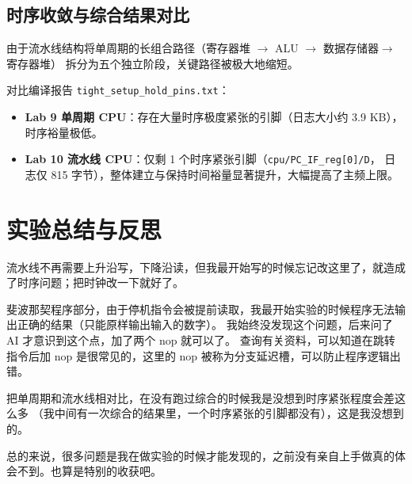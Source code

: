 \documentclass[12pt, a4paper]{ctexart}
\begin{document}
\subsection{时序收敛与综合结果对比}

由于流水线结构将单周期的长组合路径（寄存器堆 $\to$ ALU $\to$ 数据存储器$\to$ 寄存器堆）
拆分为五个独立阶段，关键路径被极大地缩短。

对比编译报告 \texttt{tight\_setup\_hold\_pins.txt}：
\begin{itemize}
    \item \textbf{Lab 9 单周期 CPU}：存在大量时序极度紧张的引脚（日志大小约 3.9 KB），时序裕量极低。
    \item \textbf{Lab 10 流水线 CPU}：仅剩 1 个时序紧张引脚（\texttt{cpu/PC\_IF\_reg[0]/D}，
    日志仅 815 字节），整体建立与保持时间裕量显著提升，大幅提高了主频上限。
\end{itemize}

\section{实验总结与反思}

流水线不再需要上升沿写，下降沿读，但我最开始写的时候忘记改这里了，就造成了时序问题；把时钟改一下就好了。

斐波那契程序部分，由于停机指令会被提前读取，我最开始实验的时候程序无法输出正确的结果（只能原样输出输入的数字）。
我始终没发现这个问题，后来问了 AI 才意识到这个点，加了两个 nop 就可以了。
查询有关资料，可以知道在跳转指令后加 nop 是很常见的，这里的 nop 被称为分支延迟槽，可以防止程序逻辑出错。

把单周期和流水线相对比，在没有跑过综合的时候我是没想到时序紧张程度会差这么多
（我中间有一次综合的结果里，一个时序紧张的引脚都没有），这是我没想到的。

总的来说，很多问题是我在做实验的时候才能发现的，之前没有亲自上手做真的体会不到。也算是特别的收获吧。
\end{document}
